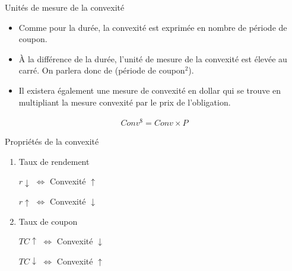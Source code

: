 \documentclass[11pt]{beamer}
\begin{document}
\begin{frame}{Unités de mesure de la convexité}
\begin{itemize}
\item Comme pour la durée,  la convexité est exprimée en nombre de période de coupon.  
\item À la différence de la durée,  l'unité de mesure de la convexité est élevée au carré.  On parlera donc de (période de coupon$^2$).  
\item Il existera également une mesure de convexité en dollar qui se trouve en multipliant la mesure convexité par le prix de l'obligation.
\end{itemize}
\begin{align*}
Conv^{\$}=Conv \times P
\end{align*}
\end{frame}

\begin{frame}{Propriétés de la convexité}
\begin{enumerate}
\item Taux de rendement
\begin{center}
$r \downarrow$ \hspace{1cm} $\Longleftrightarrow$  \hspace{1cm} Convexité $\uparrow$
\end{center}
\begin{center}
$r \uparrow$ \hspace{1cm} $\Longleftrightarrow$  \hspace{1cm} Convexité $\downarrow$
\end{center}
\item Taux de coupon
\begin{center}
$TC \uparrow$ \hspace{1cm} $\Longleftrightarrow$  \hspace{1cm} Convexité $\downarrow$
\end{center}
\begin{center}
$TC \downarrow$ \hspace{1cm} $\Longleftrightarrow$  \hspace{1cm} Convexité $\uparrow$
\end{center}
\end{enumerate}
\end{frame}
\end{document}
